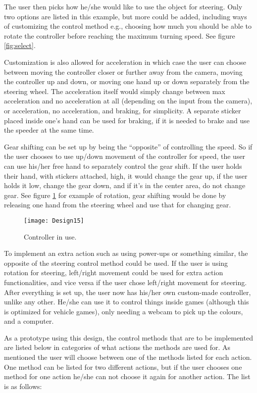 The user then picks how he/she would like to use the object for steering. Only two options are listed in this example, but more could be added, including ways of customizing the control method e.g., choosing how much you should be able to rotate the controller before reaching the maximum turning speed. See figure \ref{fig:select}.
\bigskip

Customization is also allowed for acceleration in which case the user can choose between moving the controller closer or further away from the camera, moving the controller up and down, or moving one hand up or down separately from the steering wheel. 
The acceleration itself would simply change between max acceleration and no acceleration at all (depending on the input from the camera), or acceleration, no acceleration, and braking, for simplicity. A separate sticker placed inside one’s hand can be used for braking, if it is needed to brake and use the speeder at the same time.
\bigskip

Gear shifting can be set up by being the “opposite” of controlling the speed. So if the user chooses to use up/down movement of the controller for speed, the user can use his/her free hand to separately control the gear shift. If the user holds their hand, with stickers attached, high, it would change the gear up, if the user holds it low, change the gear down, and if it’s in the center area, do not change gear. See figure \ref{fig:design15} for example of rotation, gear shifting would be done by releasing one hand from the steering wheel and use that for changing gear.

\begin{figure}[!htbp]
\centering
\texttt{[image: Design15]}
\caption{Controller in use.}
\label{fig:design15}
\end{figure}

To implement an extra action such as using power-ups or something similar, the opposite
of the steering control method could be used. If the user is using rotation for steering,
left/right movement could be used for extra action functionalities, and vice versa if the user
chose left/right movement for steering. After everything is set up, the user now has his/her own custom-made controller, unlike any other. He/she can use it to control things inside games (although this is optimized for vehicle games), only needing a webcam to pick up the colours, and a computer.
\bigskip

As a prototype using this design, the control methods that are to be implemented are listed below in categories of what actions the methods are used for. As mentioned the user will choose between one of the methods listed for each action. One method can be listed for two different actions, but if the user chooses one method for one action he/she can not choose it again for another action. The list is as follows:

